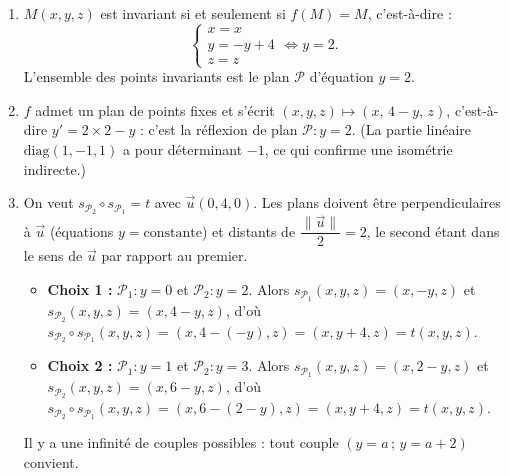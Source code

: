 \documentclass[11pt]{article}
\newcommand{\cle}[1]{{\popxbold\color{popdark}#1}}
\begin{document}
\begin{corrige}
\begin{enumerate}
\item $M(x,y,z)$ est invariant si et seulement si $f(M)=M$, c'est-à-dire :
\[ \begin{cases} x=x \\ y=-y+4 \\ z=z \end{cases}\iff y=2. \]
L'ensemble des points invariants est le \cle{plan} $\mathcal{P}$ d'équation $y=2$.
\item $f$ admet un plan de points fixes et s'écrit $(x,y,z)\mapsto(x,\,4-y,\,z)$, c'est-à-dire $y'=2\times 2-y$ : c'est la \cle{réflexion} de plan $\mathcal{P}:y=2$. (La partie linéaire $\mathrm{diag}(1,-1,1)$ a pour déterminant $-1$, ce qui confirme une isométrie indirecte.)
\item On veut $s_{\mathcal{P}_2}\circ s_{\mathcal{P}_1}=t$ avec $\vec{u}(0,4,0)$. Les plans doivent être perpendiculaires à $\vec{u}$ (équations $y=\text{constante}$) et distants de $\dfrac{\|\vec{u}\|}{2}=2$, le second étant dans le sens de $\vec{u}$ par rapport au premier.
\begin{itemize}
\item \textbf{Choix 1 :} $\mathcal{P}_1:y=0$ et $\mathcal{P}_2:y=2$. Alors $s_{\mathcal{P}_1}(x,y,z)=(x,-y,z)$ et $s_{\mathcal{P}_2}(x,y,z)=(x,4-y,z)$, d'où $s_{\mathcal{P}_2}\circ s_{\mathcal{P}_1}(x,y,z)=(x,4-(-y),z)=(x,y+4,z)=t(x,y,z)$.
\item \textbf{Choix 2 :} $\mathcal{P}_1:y=1$ et $\mathcal{P}_2:y=3$. Alors $s_{\mathcal{P}_1}(x,y,z)=(x,2-y,z)$ et $s_{\mathcal{P}_2}(x,y,z)=(x,6-y,z)$, d'où $s_{\mathcal{P}_2}\circ s_{\mathcal{P}_1}(x,y,z)=(x,6-(2-y),z)=(x,y+4,z)=t(x,y,z)$.
\end{itemize}
Il y a une infinité de couples possibles : tout couple $(y=a\,;\,y=a+2)$ convient.
\end{enumerate}
\end{corrige}
\end{document}
